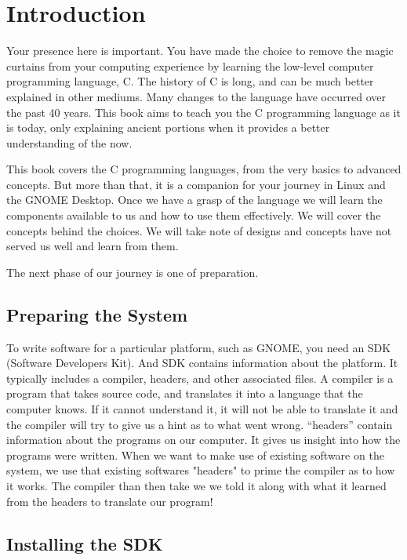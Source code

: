 \chapter{Introduction}

Your presence here is important. You have made the choice to remove the magic
curtains from your computing experience by learning the low-level computer
programming language, C. The history of C is long, and can be much better
explained in other mediums. Many changes to the language have occurred over
the past 40 years. This book aims to teach you the C programming language as
it is today, only explaining ancient portions when it provides a better
understanding of the now.

This book covers the C programming languages, from the very basics to advanced
concepts. But more than that, it is a companion for your journey in Linux and
the GNOME Desktop. Once we have a grasp of the language we will learn the
components available to us and how to use them effectively. We will cover the
concepts behind the choices. We will take note of designs and concepts have
not served us well and learn from them.

The next phase of our journey is one of preparation.


\section{Preparing the System}

To write software for a particular platform, such as GNOME, you need an SDK
(Software Developers Kit). And SDK contains information about the platform. It
typically includes a compiler, headers, and other associated files. A compiler
is a program that takes source code, and translates it into a language that the
computer knows. If it cannot understand it, it will not be able to translate it
and the compiler will try to give us a hint as to what went wrong. “headers”
contain information about the programs on our computer. It gives us insight
into how the programs were written. When we want to make use of existing
software on the system, we use that existing softwares "headers" to prime the
compiler as to how it works. The compiler than then take we we told it along
with what it learned from the headers to translate our program!


\section{Installing the SDK}

